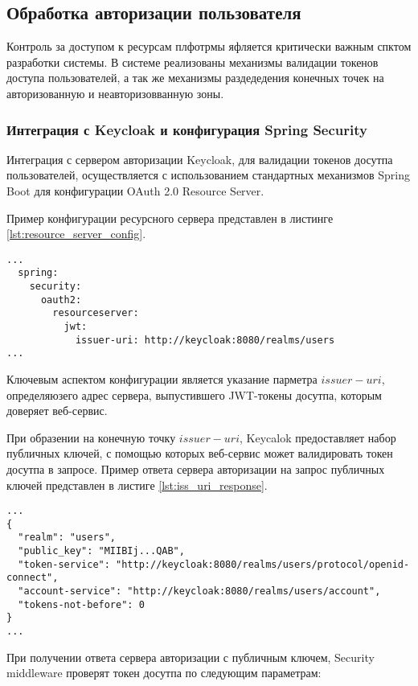 \subsection{Обработка авторизации пользователя}

Контроль за доступом к ресурсам плфотрмы яфляется критически важным спктом разработки системы. В системе реализованы механизмы валидации токенов доступа пользователей, а так же механизмы раздедедения конечных точек на авторизованную и неавторизовванную зоны.

\subsubsection{Интеграция с Keycloak и конфигурация Spring Security}

Интеграция с сервером авторизации Keycloak, для валидации токенов досутпа пользователей, осуществляется с использованием стандартных механизмов Spring Boot для конфигурации OAuth 2.0 Resource Server\cite{ferry2015security}.

Пример конфигурации ресурсного сервера представлен в листинге \ref{lst:resource_server_config}.

\begin{lstlisting}[caption={Конфигурация Resource Server}, label=lst:resource_server_config]
...
  spring:
    security:
      oauth2:
        resourceserver:
          jwt:
            issuer-uri: http://keycloak:8080/realms/users
...
\end{lstlisting}

Ключевым аспектом конфигурации является указание парметра $issuer-uri$, определяюзего адрес сервера, выпустившего JWT-токены досутпа, которым доверяет веб-сервис.

При образении на конечную точку $issuer-uri$, Keycalok предоставляет набор публичных ключей, с помощью которых веб-сервис может валидировать токен досутпа в запросе. Пример ответа сервера авторизации на запрос публичных ключей представлен в листиге \ref{lst:iss_uri_response}.

\begin{lstlisting}[caption={Ответ на запрос публичного ключа}, label=lst:iss_uri_response]
...
{
  "realm": "users",
  "public_key": "MIIBIj...QAB",
  "token-service": "http://keycloak:8080/realms/users/protocol/openid-connect",
  "account-service": "http://keycloak:8080/realms/users/account",
  "tokens-not-before": 0
}
...
\end{lstlisting}

При получении ответа сервера авторизации с публичным ключем, Security middleware проверят токен досутпа по следующим параметрам:

